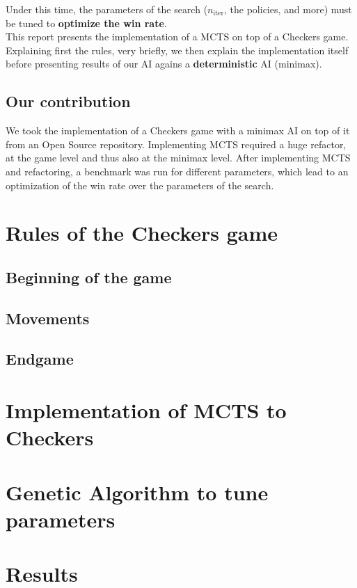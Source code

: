 \documentclass[11pt,a4paper]{article}
\begin{document}
Under this time, the parameters of the search ($n_{\text{iter}}$, the policies, and more) must be tuned to \textbf{optimize the win rate}. \\

This report presents the implementation of a MCTS on top of a Checkers game. Explaining first the rules, very briefly, we then explain the implementation itself before presenting results of our AI agains a \textbf{deterministic} AI (minimax).

\subsection{Our contribution}
We took the implementation of a Checkers game with a minimax AI on top of it from an Open Source repository. Implementing MCTS required a huge refactor, at the game level and thus also at the minimax level. After implementing MCTS and refactoring, a benchmark was run for different parameters, which lead to an optimization of the win rate over the parameters of the search. 
\section{Rules of the Checkers game}
\subsection{Beginning of the game}
\subsection{Movements}
\subsection{Endgame}
  

\section{Implementation of MCTS to Checkers}

\section{Genetic Algorithm to tune parameters}

\section{Results}
\end{document}
